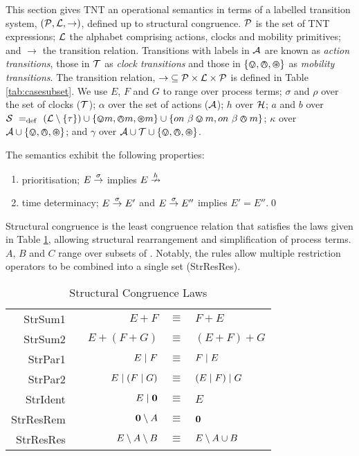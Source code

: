 \documentclass[orivec,envcountsame]{llncs}
\begin{document}
This section gives TNT an operational semantics in terms of a labelled
transition system, $(\text{$\mathcal{P}$}, \text{$\mathcal{L}$}, \rightarrow)$, defined
up to structural congruence.  $\text{$\mathcal{P}$}$ is the set of TNT expressions; $\text{$\mathcal{L}$}$ the
alphabet comprising actions, clocks and mobility primitives; and $\rightarrow$ the
transition relation.  Transitions with labels in
$\text{$\mathcal{A}$}$ are known as \emph{action transitions}, those in $\text{$\mathcal{T}$}$ as
\emph{clock transitions} and those in $\text{$\{ \varovee, \varowedge , \varoast\}$}$ as \emph{mobility
transitions}.  The transition relation, $\mathop{\rightarrow} \mathrel{\subseteq}
\text{$\mathcal{P}$} \times \text{$\mathcal{L}$} \times \text{$\mathcal{P}$}$ is defined in Table \ref{tab:casesubset}.
We use $E$, $F$ and $G$ to range over process terms; $\sigma$ and $\rho$ over the
set of clocks ($\text{$\mathcal{T}$}$); $\alpha$ over the set of actions
($\text{$\mathcal{A}$}$); $h$ over $\text{$\mathcal{H}$}$; $a$ and $b$ over 
$\text{$\mathcal{S}$} \mathrel{~=_\mathrm{def}~}
\left(\text{$\mathcal{L}$} \setminus \{\tau\}\right) 
\cup 
\{ \varovee m, \varowedge m, \varoast m \} 
\cup
\{ on\ \beta \varovee m, on\ \beta \varowedge m \}
$;
$\kappa$ over $\text{$\mathcal{A}$} \cup \text{$\{ \varovee, \varowedge , \varoast\}$}$;
and $\gamma$ over $\text{$\mathcal{A}$} \cup \text{$\mathcal{T}$} \cup \text{$\{ \varovee, \varowedge , \varoast\}$}$.

\clearpage
\begin{proposition}
The semantics exhibit the following properties:
\begin{enumerate}
\item prioritisation;
$E \stackrel{\sigma}{\rightarrow}$ implies $E \stackrel{h}{\nrightarrow}$ 
\item time determinacy; $E \stackrel{\sigma}{\rightarrow} E'$ and $E
\stackrel{\sigma}{\rightarrow} E''$ implies $E' = E''$.\qed
\end{enumerate}
\end{proposition}

Structural congruence is the least congruence relation that satisfies
the laws given in Table \ref{tab:structcong}, allowing structural
rearrangement and simplification of process terms. $A$, $B$ and $C$
range over subsets of \symbols.  Notably, the rules allow multiple
restriction operators to be combined into a single set (StrResRes).

\begin{table}
 \caption{Structural Congruence Laws}
 \label{tab:structcong}
 \vspace{-3mm}
  \shrule \centering
  \begin{tabular}{rcrcl}
  StrSum1 & \quad\quad &  
  $E + F$              & $\equiv$ & $F + E$
\\
  StrSum2 &&  
  $E + (F + G)$        & $\equiv$ & $(E + F) + G$
\\
  StrPar1 &&  
  $E \mid F$            & $\equiv$ & $F \mid E$
\\
  StrPar2 &&  
  $E \mid (F \mid G)$    & $\equiv$ & $(E \mid F) \mid G$
\\
  StrIdent &&  
  $E \mid \textbf{0}$         & $\equiv$ & $E$
\\
  StrResRem &&  
  $\textbf{0} \setminus {A}$       & $\equiv$ & $\textbf{0}$
\\
  StrResRes &&  
  $E \setminus {A} \setminus {B}$  & $\equiv$ & $E \setminus {A \cup B}$
  \end{tabular}
  \shrule
\end{table}
\end{document}
